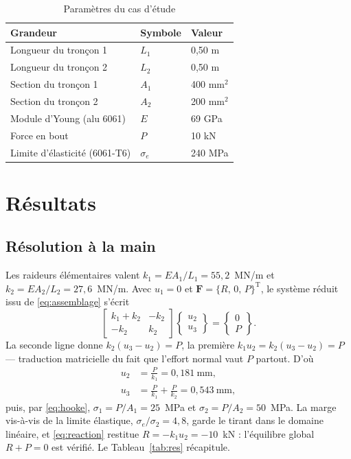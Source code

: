 \documentclass[10pt,journal]{IEEEtran}
\begin{document}
\begin{table}[!t]
\caption{Paramètres du cas d'étude}
\label{tab:param}
\centering
\begin{tabular}{@{}lll@{}}
\toprule
Grandeur & Symbole & Valeur \\
\midrule
Longueur du tronçon 1 & $L_1$ & 0,50 m \\
Longueur du tronçon 2 & $L_2$ & 0,50 m \\
Section du tronçon 1 & $A_1$ & 400 mm$^2$ \\
Section du tronçon 2 & $A_2$ & 200 mm$^2$ \\
Module d'Young (alu 6061) & $E$ & 69 GPa \\
Force en bout & $P$ & 10 kN \\
Limite d'élasticité (6061-T6) & $\sigma_e$ & 240 MPa \\
\bottomrule
\end{tabular}
\end{table}

\section{Résultats}
\subsection{Résolution à la main}
Les raideurs élémentaires valent $k_1 = EA_1/L_1 = 55{,}2$~MN/m et $k_2 = EA_2/L_2 = 27{,}6$~MN/m. Avec $u_1 = 0$ et $\mathbf{F} = \{R,\,0,\,P\}^{\mathrm T}$, le système réduit issu de \eqref{eq:assemblage} s'écrit
\begin{equation}
\begin{bmatrix} k_1+k_2 & -k_2 \\ -k_2 & k_2 \end{bmatrix}
\begin{Bmatrix} u_2 \\ u_3 \end{Bmatrix}
=
\begin{Bmatrix} 0 \\ P \end{Bmatrix}.
\label{eq:reduit}
\end{equation}
La seconde ligne donne $k_2(u_3-u_2)=P$, la première $k_1 u_2 = k_2(u_3-u_2) = P$ --- traduction matricielle du fait que l'effort normal vaut $P$ partout. D'où
\begin{align}
u_2 &= \frac{P}{k_1} = 0{,}181~\text{mm}, \\
u_3 &= \frac{P}{k_1} + \frac{P}{k_2} = 0{,}543~\text{mm},
\end{align}
puis, par \eqref{eq:hooke}, $\sigma_1 = P/A_1 = 25$~MPa et $\sigma_2 = P/A_2 = 50$~MPa. La marge vis-à-vis de la limite élastique, $\sigma_e/\sigma_2 = 4{,}8$, garde le tirant dans le domaine linéaire, et \eqref{eq:reaction} restitue $R = -k_1 u_2 = -10$~kN : l'équilibre global $R+P=0$ est vérifié. Le Tableau~\ref{tab:res} récapitule.
\end{document}

